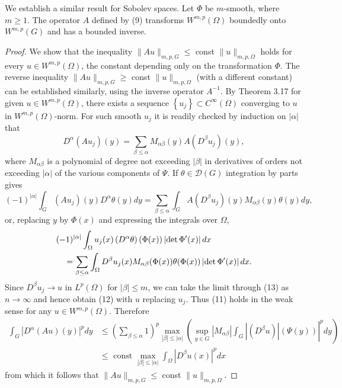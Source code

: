 \begin{theorem}
  We establish a similar result for Sobolev spaces.
  Let $\Phi$ be $m$-smooth, where $m \geq 1$. The operator $A$ defined by (9) transforms $W^{m, p}(\Omega)$ boundedly onto $W^{m, p}(G)$ and has a bounded inverse.
\end{theorem}

\begin{proof}
  We show that the inequality $\|A u\|_{m, p, G} \leq$ const $\|u\|_{m, p, \Omega}$ holds for every $u \in W^{m, p}(\Omega)$, the constant depending only on the transformation $\Phi$. The reverse inequality $\|A u\|_{m, p, G} \geq$ const $\|u\|_{m, p, \Omega}$ (with a different constant) can be established similarly, using the inverse operator $A^{-1}$. By Theorem 3.17 for given $u \in W^{m, p}(\Omega)$, there exists a sequence $\left\{u_j\right\} \subset C^{\infty}(\Omega)$ converging to $u$ in $W^{m, p}(\Omega)$-norm. For such smooth $u_j$ it is readily checked by induction on $|\alpha|$ that
  \begin{equation}\label{eq:3.11}
  D^\alpha\left(A u_j\right)(y)=\sum_{\beta \leq \alpha} M_{\alpha \beta}(y) A\left(D^\beta u_j\right)(y),
  \end{equation}
  where $M_{\alpha \beta}$ is a polynomial of degree not exceeding $|\beta|$ in derivatives of orders not exceeding $|\alpha|$ of the various components of $\Psi$. If $\theta \in \mathscr{D}(G)$ integration by parts gives
  \begin{equation}\label{eq:3.12}
  (-1)^{|\alpha|} \int_G\left(A u_j\right)(y) D^\alpha \theta(y) d y=\sum_{\beta \leq \alpha} \int_G A\left(D^\beta u_j\right)(y) M_{\alpha \beta}(y) \theta(y) d y,
  \end{equation}
  or, replacing $y$ by $\Phi(x)$ and expressing the integrals over $\Omega$,
  \begin{align}
  & (-1)^{|\alpha|} \int_{\Omega} u_j(x)\left(D^\alpha \theta\right)(\Phi(x))\left|\operatorname{det} \Phi^{\prime}(x)\right| d x \notag \\
  & \quad=\sum_{\beta \leq \alpha} \int_{\Omega} D^\beta u_j(x) M_{\alpha \beta}(\Phi(x)) \theta(\Phi(x))\left|\operatorname{det} \Phi^{\prime}(x)\right| d x . \label{eq:3.13}
  \end{align}
  Since $D^\beta u_j \rightarrow u$ in $L^p(\Omega)$ for $|\beta| \leq m$, we can take the limit through (13) as $n \rightarrow \infty$ and hence obtain (12) with $u$ replacing $u_j$. Thus (11) holds in the weak sense for any $u \in W^{m, p}(\Omega)$. Therefore
  \[
  \begin{aligned}
  \int_G\left|D^\alpha(A u)(y)\right|^p d y & \leq\left(\sum_{\beta \leq \alpha} 1\right)^p \max _{|\beta| \leq|\alpha|}\left(\left.\sup _{y \in G}\left|M_{\alpha \beta}\right| \int_G\left|\left(D^\beta u\right)\right|(\Psi(y))\right|^p d y\right) \\
  & \leq \text { const } \max _{|\beta| \leq|\alpha|} \int_{\Omega}\left|D^\beta u(x)\right|^p d x
  \end{aligned}
  \]
  from which it follows that $\|A u\|_{m, p, G} \leq$ const $\|u\|_{m, p, \Omega}$.
\end{proof}

